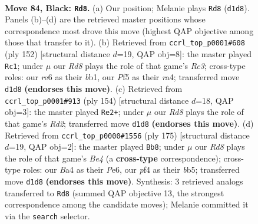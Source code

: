 \documentclass[11pt]{article}
\begin{document}
\clearpage

\begin{figure}[p]\centering
\begin{subfigure}{0.46\textwidth}\centering
\resizebox{\linewidth}{!}{%
\newchessgame
\chessboard[
  setfen={8/P5k1/4R3/2b2p2/b4P2/8/7K/3r4 b - - 4 84},
  showmover=false,
  pgfstyle=straightmove, color=movearrow, markmove={d1-d8}
]}
\caption{}
\end{subfigure}\hfill
\begin{subfigure}{0.46\textwidth}\centering
\resizebox{\linewidth}{!}{%
\newchessgame
\chessboard[
  setfen={8/8/p6k/8/r1BB1K2/2R5/8/1b6 w - - 7 77},
  showmover=false,
  pgfstyle=straightmove, color=movearrow, markmove={c3-c1}
]}
\caption{}
\end{subfigure}
\\[4pt]
\begin{subfigure}{0.46\textwidth}\centering
\resizebox{\linewidth}{!}{%
\newchessgame
\chessboard[
  setfen={8/8/4kpBp/7P/1r6/6K1/3R4/8 w - - 17 78},
  showmover=false,
  pgfstyle=straightmove, color=movearrow, markmove={d2-e2}
]}
\caption{}
\end{subfigure}\hfill
\begin{subfigure}{0.46\textwidth}\centering
\resizebox{\linewidth}{!}{%
\newchessgame
\chessboard[
  setfen={5k2/R7/1p2p3/1B2b2K/4b3/P7/8/8 b - - 9 88},
  showmover=false,
  pgfstyle=straightmove, color=movearrow, markmove={e5-b8}
]}
\caption{}
\end{subfigure}
\caption{\textbf{Move 84, Black: \texttt{Rd8}.} (a) Our position; Melanie plays \texttt{Rd8} (\texttt{d1d8}). Panels (b)--(d) are the retrieved master positions whose correspondence most drove this move (highest QAP objective among those that transfer to it). (b) Retrieved from \texttt{ccrl\_top\_p0001\#608} (ply 152) [structural distance $d$=19, QAP obj=8]: the master played \texttt{Rc1}; under $\mu$ our \emph{Rd8} plays the role of that game's \emph{Rc3}; cross-type roles: our \emph{r}e6 as their \emph{b}b1, our \emph{P}f5 as their \emph{r}a4; transferred move \texttt{d1d8} \textbf{(endorses this move)}. (c) Retrieved from \texttt{ccrl\_top\_p0001\#913} (ply 154) [structural distance $d$=18, QAP obj=3]: the master played \texttt{Re2+}; under $\mu$ our \emph{Rd8} plays the role of that game's \emph{Rd2}; transferred move \texttt{d1d8} \textbf{(endorses this move)}. (d) Retrieved from \texttt{ccrl\_top\_p0000\#1556} (ply 175) [structural distance $d$=19, QAP obj=2]: the master played \texttt{Bb8}; under $\mu$ our \emph{Rd8} plays the role of that game's \emph{Be4} (a \textbf{cross-type} correspondence); cross-type roles: our \emph{B}a4 as their \emph{P}e6, our \emph{p}f4 as their \emph{b}b5; transferred move \texttt{d1d8} \textbf{(endorses this move)}. Synthesis: 3 retrieved analogs transferred to \texttt{Rd8} (summed QAP objective 13, the strongest correspondence among the candidate moves); Melanie committed it via the \texttt{search} selector.}
\label{fig:thought-m167}
\end{figure}
\end{document}
